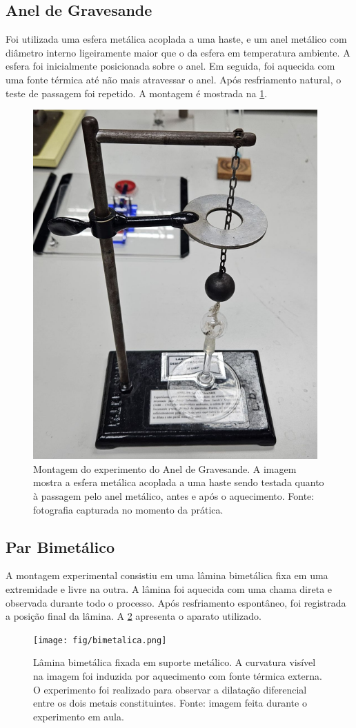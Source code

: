 \subsection{Anel de Gravesande}
Foi utilizada uma esfera metálica acoplada a uma haste, e um anel metálico com diâmetro interno ligeiramente maior que o da esfera em temperatura ambiente. A esfera foi inicialmente posicionada sobre o anel. Em seguida, foi aquecida com uma fonte térmica até não mais atravessar o anel. Após resfriamento natural, o teste de passagem foi repetido. A montagem é mostrada na \cref{fig:gravesande}.

\begin{figure}[H]
    \centering
    \includegraphics[width=0.30\linewidth]{fig/gravesande.png}
    \caption{Montagem do experimento do Anel de Gravesande. A imagem mostra a esfera metálica acoplada a uma haste sendo testada quanto à passagem pelo anel metálico, antes e após o aquecimento. Fonte: fotografia capturada no momento da prática.}
    \label{fig:gravesande}
\end{figure}

\subsection{Par Bimetálico}
A montagem experimental consistiu em uma lâmina bimetálica fixa em uma extremidade e livre na outra. A lâmina foi aquecida com uma chama direta e observada durante todo o processo. Após resfriamento espontâneo, foi registrada a posição final da lâmina. A \cref{fig:bimetalico} apresenta o aparato utilizado.

\begin{figure}[H]
    \centering
    \texttt{[image: fig/bimetalica.png]}
    \caption{Lâmina bimetálica fixada em suporte metálico. A curvatura visível na imagem foi induzida por aquecimento com fonte térmica externa. O experimento foi realizado para observar a dilatação diferencial entre os dois metais constituintes. Fonte: imagem feita durante o experimento em aula.}
    \label{fig:bimetalico}
\end{figure}
